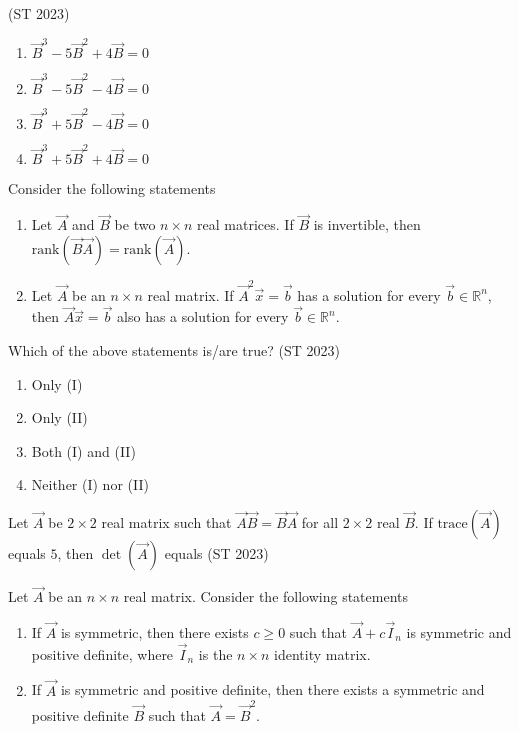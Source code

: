 	\hfill(ST 2023) 
	\begin{multicols}{2}
\begin{enumerate}
    \item $\vec{B}^3 - 5\vec{B}^2 + 4\vec{B} = 0$
    \item $\vec{B}^3 - 5\vec{B}^2 - 4\vec{B} = 0$
    \item $\vec{B}^3 + 5\vec{B}^2 - 4\vec{B} = 0$
    \item $\vec{B}^3 + 5\vec{B}^2 + 4\vec{B} = 0$
\end{enumerate}
\end{multicols}
\item Consider the following statements
	\begin{enumerate}[label=(\Roman*)]
\item Let $\vec{A}$ and $\vec{B}$ be two $n\times n$ real matrices. If $\vec{B}$ is invertible, then $\mathrm{rank}(\vec{B}\vec{A}) = \mathrm{rank}(\vec{A})$.
\item Let $\vec{A}$ be an $n\times n$ real matrix. If $\vec{A}^2 \vec{x} = \vec{b}$ has a solution for every $\vec{b} \in \mathbb{R}^n$, then $\vec{A}\vec{x} = \vec{b}$ also has a solution for every $\vec{b} \in \mathbb{R}^n$.
\end{enumerate}
Which of the above statements is/are true? \hfill(ST 2023) 
	\begin{multicols}{2}
\begin{enumerate}
    \item Only (I)
    \item Only (II)
    \item Both (I) and (II)
    \item Neither (I) nor (II)
\end{enumerate}
\end{multicols}
\item Let $\vec{A}$ be $2\times 2$ real matrix such that $\vec{A}\vec{B}=\vec{B}\vec{A}$ for all $2\times2$ real $\vec{B}$. If $\mathrm{trace}(\vec{A})$ equals $5$, then $\det(\vec{A})$  equals \underline{\hspace{3cm}}\hfill(ST 2023)
\item Let $\vec{A}$ be an $n\times n$ real matrix. Consider the following statements
	\begin{enumerate}[label=(\Roman*)]
		\item If $\vec{A}$ is symmetric, then there exists $c \ge 0$ such that $\vec{A} + c \vec{I}_n$ is symmetric and positive definite, where $\vec{I}_n$ is the $n\times n$ identity matrix. 
		\item  If $\vec{A}$ is symmetric and positive definite, then there exists a symmetric and positive definite $\vec{B}$ such that $\vec{A} = \vec{B}^2$. 
	\end{enumerate}
